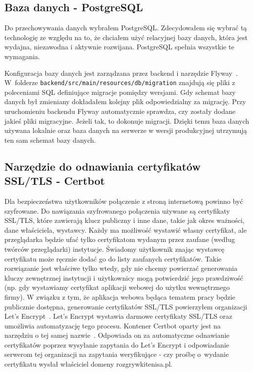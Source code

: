\documentclass[shortabstract]{iithesis}
\begin{document}
\subsection{Baza danych - PostgreSQL}
Do przechowywania danych wybrałem PostgreSQL.
Zdecydowałem się wybrać tą technologię ze względu na to, że chciałem użyć relacyjnej bazy danych, która jest wydajna, niezawodna i aktywnie rozwijana. PostgreSQL spełnia wszystkie te wymagania.
\par
Konfiguracja bazy danych jest zarządzana przez backend i narzędzie Flyway~\cite{Flyway}.
W~folderze \texttt{backend/src/main/resources/db/migration} znajdują się pliki z poleceniami SQL definiujące migracje pomiędzy wersjami.
Gdy schemat bazy danych był zmieniany dokładałem kolejny plik odpowiedzialny za migrację. Przy uruchomieniu backendu Flyway automatycznie sprawdza, czy zostały dodane jakieś pliki migracyjne.
Jeżeli tak, to dokonuje migracji.
Dzięki temu baza danych używana lokalnie oraz baza danych na serwerze w wersji produkcyjnej utrzymują ten sam schemat bazy danych.

\subsection{Narzędzie do odnawiania certyfikatów SSL/TLS - Certbot}
Dla bezpieczeństwa użytkowników połączenie z stroną internetową powinno być szyfrowane.
Do nawiązania szyfrowanego połączenia używane są certyfikaty SSL/TLS, które zawierają klucz publiczny i inne dane, takie jak okres ważności, dane właściciela, wystawcy.
Każdy ma możliwość wystawić własny certyfikat, ale przeglądarka będzie ufać tylko certyfikatom wydanym przez zaufane (według twórców przeglądarki) instytucje.
Świadomy użytkownik znając wystawcę certyfikatu może ręcznie dodać go do listy zaufanych certyfikatów. Takie rozwiązanie jest właściwe tylko wtedy, gdy nie chcemy powierzać generowania kluczy zewnętrznej instytucji i użytkownicy mogą potwierdzić jego prawdziwość (np. gdy wystawiamy certyfikat aplikacji webowej do użytku wewnętrznego firmy).
W związku z tym, że aplikacja webowa będąca tematem pracy będzie publicznie dostępna, generowanie certyfikatów SSL/TLS powierzyłem organizacji Let's Encrypt~\cite{LetsEncrypt}.
Let's Encrypt wystawia darmowe certyfikaty SSL/TLS oraz umożliwia automatyzację tego procesu.
Kontener Certbot oparty jest na narzędziu o tej samej nazwie~\cite{Certbot}.
Odpowiada on za automatyczne odnawianie certyfikatów poprzez wysyłanie zapytania do Let's Encrypt i odpowiadanie serwerom tej organizacji na zapytania weryfikujące - czy prośbę o~wydanie certyfikatu wysłał właściciel domeny rozgrywkitenisa.pl.
\end{document}
